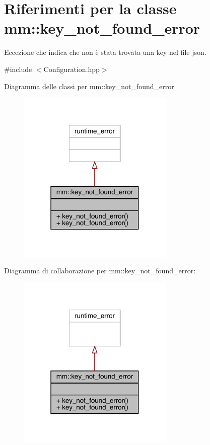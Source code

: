 \hypertarget{classmm_1_1key__not__found__error}{}\section{Riferimenti per la classe mm\+:\+:key\+\_\+not\+\_\+found\+\_\+error}
\label{classmm_1_1key__not__found__error}


Eccezione che indica che non è stata trovata una key nel file json.  




{\ttfamily \#include $<$Configuration.\+hpp$>$}



Diagramma delle classi per mm\+:\+:key\+\_\+not\+\_\+found\+\_\+error\nopagebreak
\begin{figure}[H]
\begin{center}
\leavevmode
\includegraphics[width=211pt]{d4/de8/classmm_1_1key__not__found__error__inherit__graph}
\end{center}
\end{figure}


Diagramma di collaborazione per mm\+:\+:key\+\_\+not\+\_\+found\+\_\+error\+:\nopagebreak
\begin{figure}[H]
\begin{center}
\leavevmode
\includegraphics[width=211pt]{d0/da9/classmm_1_1key__not__found__error__coll__graph}
\end{center}
\end{figure}
